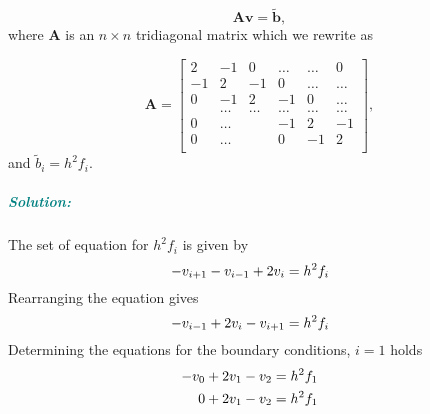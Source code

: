 \documentclass[%
oneside,                 %
final,                   %
10pt]{article}
\begin{document}
\begin{equation*}
   \mathbf{A}\mathbf{v} = \tilde{\mathbf{b}},
\end{equation*}
where $\mathbf{A}$ is an $n\times n$  tridiagonal matrix which we rewrite as

\[
    \mathbf{A} = \begin{bmatrix}
                           2& -1& 0 &\dots   & \dots &0 \\
                           -1 & 2 & -1 &0 &\dots &\dots \\
                           0&-1 &2 & -1 & 0 & \dots \\
                           & \dots   & \dots &\dots   &\dots & \dots \\
                           0&\dots   &  &-1 &2& -1 \\
                           0&\dots    &  & 0  &-1 & 2 \\
                      \end{bmatrix},
\]
and $\tilde{b}_i=h^2f_i$.
\subparagraph{\textcolor{teal}{Solution:}}
The set of equation for $h^2f_i$ is given by
\begin{equation*}
   -v_{i+1}-v_{i-1}+2v_i = h^2f_i  \hspace{0.5cm} 
\end{equation*}
Rearranging the equation gives
\begin{equation*}
  -v_{i-1}+2v_i - v_{i+1}= h^2f_i  \hspace{0.5cm} 
\end{equation*}
Determining the equations for the boundary conditions, $i=1$ holds 
\begin{equation*}
\begin{aligned}
  -v_{0}+2v_1 - v_{2}&= h^2f_1  \hspace{0.5cm} \\
  0 + 2v_1 - v_{2}&= h^2f_1  \hspace{0.5cm} 
\end{aligned}
\end{equation*}
\end{document}
